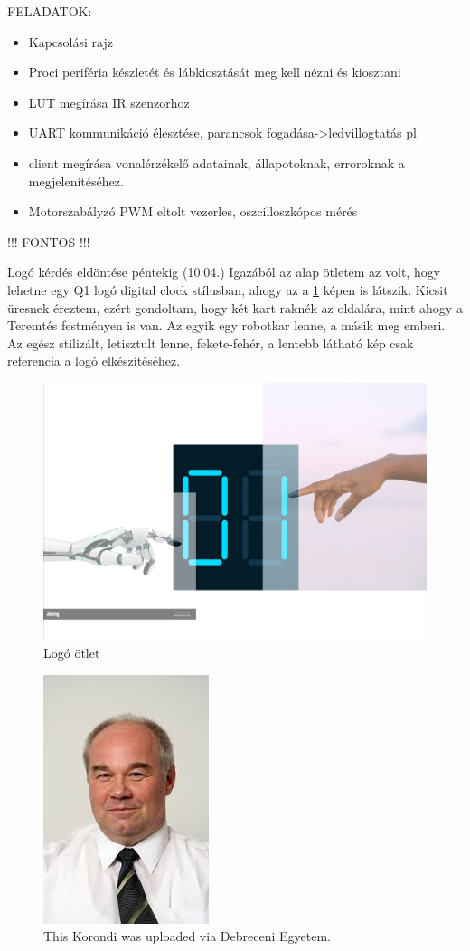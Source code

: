 \documentclass{article}
\begin{document}
FELADATOK:
\begin{itemize}
\item Kapcsolási rajz
\item Proci periféria készletét és lábkiosztását meg kell nézni és kiosztani
\item LUT megírása IR szenzorhoz
\item UART kommunikáció élesztése, parancsok fogadása->ledvillogtatás pl
\item client megírása vonalérzékelő adatainak, állapotoknak, erroroknak a megjelenítéséhez.
\item Motorszabályzó PWM eltolt vezerles, oszcilloszkópos mérés
\end{itemize}

!!! FONTOS !!!

\vspace{5mm} %

Logó kérdés eldöntése péntekig (10.04.)
Igazából az alap ötletem az volt, hogy lehetne egy Q1 logó digital clock stílusban, ahogy az a \ref{fig:logo_v0} képen is látszik. Kicsit üresnek éreztem, ezért gondoltam, hogy két kart raknék az oldalára, mint ahogy a Teremtés festményen is van. Az egyik egy robotkar lenne, a másik meg emberi. Az egész stilizált, letisztult lenne, fekete-fehér, a lentebb látható kép csak referencia a logó elkészítéséhez.

\newpage
\begin{figure}
      \centering
      \includegraphics[width=0.5\linewidth]{logo_v0.png}
      \caption{\label{fig:logo_v0}Logó ötlet}
      \end{figure}

\begin{figure}
\centering
\includegraphics[width=0.25\linewidth]{korondiP.jpg}
\caption{\label{fig:korondi}This Korondi was uploaded via Debreceni Egyetem.}
\end{figure}
\end{document}
